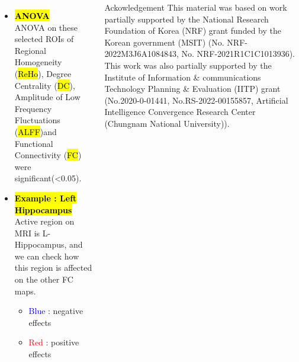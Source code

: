 \documentclass[200pt,,margin=1in,innermargin=-4.5in,blockverticalspace=-0.05in]{tikzposter}
\begin{document}
\begin{columns}
{\begin{itemize}
             \item \hl{\textbf{ANOVA}}
  \\ ANOVA on these selected ROIs of Regional Homogeneity (\hl{ReHo}), Degree Centrality (\hl{DC}), Amplitude of Low Frequency Fluctuations (\hl{ALFF})and Functional Connectivity (\hl{FC})  were significant(<0.05). 
     \item   \hl{\textbf{Example : Left Hippocampus}}
     \\ Active region on MRI is L-Hippocampus, and we can check how this region is affected on the other FC maps.

     \begin{itemize}
         \item \textcolor{blue}{Blue} : negative effects
         \item \textcolor{red}{Red} : positive effects
     \end{itemize}



\centering
{}



         
     \end{itemize} 
     


    }





\begin{block}{Ackowledgement}{
This material was based on work partially supported by the National Research Foundation of Korea (NRF) grant funded by the Korean government (MSIT) (No. NRF-2022M3J6A1084843, No. NRF-2021R1C1C1013936). This work was also partially supported by the Institute of Information \& communications Technology Planning \& Evaluation (IITP) grant (No.2020-0-01441, No.RS-2022-00155857, Artificial Intelligence Convergence Research Center (Chungnam National University)).
}
   

\end{block}
\end{columns}
\end{document}
